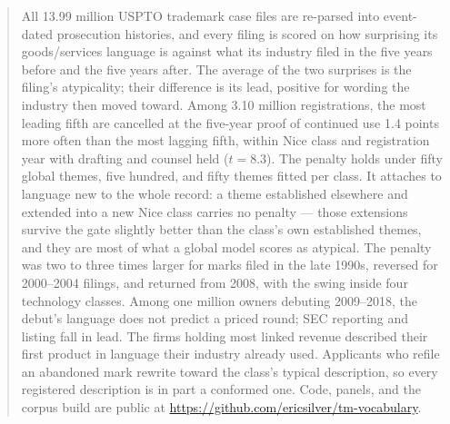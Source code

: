 \begin{abstract}
\noindent All 13.99 million USPTO trademark case files are re-parsed into
event-dated prosecution histories, and every filing is scored on how
surprising its goods/services language is against what its industry filed in
the five years before and the five years after. The average of the two
surprises is the filing's atypicality; their difference is its lead, positive
for wording the industry then moved toward. Among 3.10 million registrations,
the most leading fifth are cancelled at the five-year proof of continued
use 1.4 points more often than the most lagging fifth, within Nice class
and registration year with drafting and counsel held ($t = 8.3$). The penalty
holds under fifty global themes, five hundred, and fifty themes fitted per
class. It attaches to language new to the whole record: a theme established
elsewhere and extended into a new Nice class carries no penalty --- those
extensions survive the gate slightly better than the class's own
established themes, and they are most of what a global model scores as
atypical. The penalty was two to three
times larger for marks filed in the late 1990s, reversed for 2000--2004
filings, and returned from 2008, with the swing inside four technology
classes. Among one million owners debuting 2009--2018, the debut's language
does not predict a priced round; SEC reporting and listing fall in lead. The
firms holding most linked revenue described their first product in language
their industry already used. Applicants who refile an abandoned mark rewrite
toward the class's typical description, so every registered description is
in part a conformed one. Code, panels, and the corpus build are public at
\url{https://github.com/ericsilver/tm-vocabulary}.
\end{abstract}

